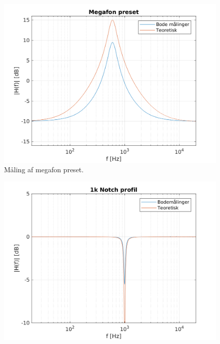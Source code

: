 \begin{figure}[h]
\centering
\includegraphics[]{matlabdemo/test/eq_megafon.png}
\caption{Måling af megafon preset.}
\end{figure}

\begin{figure}[h]
    \centering
    \includegraphics[]{matlabdemo/test/eq_1knotch.png}
\end{figure}

